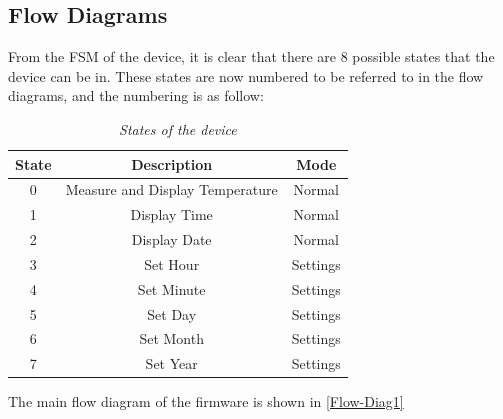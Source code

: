 \subsection{Flow Diagrams}
From the FSM of the device, it is clear that there are 8 possible states that the device can be in. These states are now numbered to be referred to in the flow diagrams, and the numbering is as follow:
\begin{table}[H]
	\centering
	\caption{\textit{States of the device}}
	\label{tab:7}
	\begin{tabular}{|c|c|c|}
		\hline
		\textbf{State} & \textbf{Description} & \textbf{Mode}\\
		\hline
		\hline
		0 & Measure and Display Temperature & Normal\\
		\hline
		1 & Display Time & Normal\\
		\hline
		2 & Display Date & Normal\\
		\hline
		3 & Set Hour & Settings\\
		\hline
		4 & Set Minute & Settings\\
		\hline
		5 & Set Day & Settings\\
		\hline
		6 & Set Month & Settings\\
		\hline
		7 & Set Year & Settings\\
		\hline
	\end{tabular}
\end{table}
\noindent
The main flow diagram of the firmware is shown in \autoref{Flow-Diag1}

